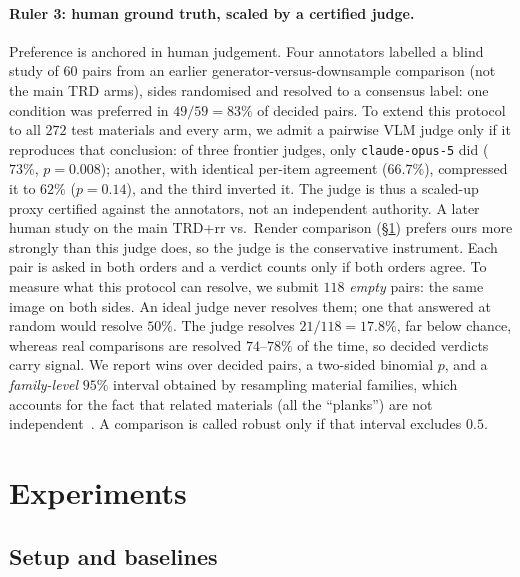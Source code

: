 \documentclass{article}
\newcommand{\trd}{\textsc{TRD}}
\begin{document}
\paragraph{Ruler 3: human ground truth, scaled by a certified judge.}
Preference is anchored in human judgement. Four annotators labelled a blind
study of $60$ pairs from an earlier generator-versus-downsample comparison
(not the main \trd{} arms), sides randomised and resolved to a consensus
label: one condition was preferred in $49/59=83\%$ of decided pairs. To
extend this protocol to all $272$ test materials and every arm, we admit a
pairwise VLM judge only if it reproduces that conclusion: of three frontier judges, only \texttt{claude-opus-5} did ($73\%$,
$p=0.008$); another, with identical per-item agreement ($66.7\%$), compressed
it to $62\%$ ($p=0.14$), and the third inverted it. The judge is thus a
scaled-up proxy certified against the annotators, not an independent
authority. A later human study on the main \trd{}+rr vs.\ Render comparison
(\S\ref{sec:experiments}) prefers ours more strongly than this judge does,
so the judge is the conservative instrument. Each pair is asked in both orders and a
verdict counts only if both orders agree. To measure what this protocol can
resolve, we submit $118$ \emph{empty} pairs: the same image on both sides.
An ideal judge never resolves them; one that answered at random would resolve
$50\%$. The judge resolves $21/118=17.8\%$, far below chance, whereas real
comparisons are resolved $74$--$78\%$ of the time, so decided verdicts carry
signal. We report wins over decided pairs, a two-sided binomial $p$, and a
\emph{family-level} $95\%$ interval obtained by resampling material families,
which accounts for the fact that related materials (all the ``planks'') are
not independent~\citep{cameron2011cluster}. A comparison is called robust only
if that interval excludes $0.5$.

\section{Experiments}
\label{sec:experiments}

\subsection{Setup and baselines}
\end{document}
